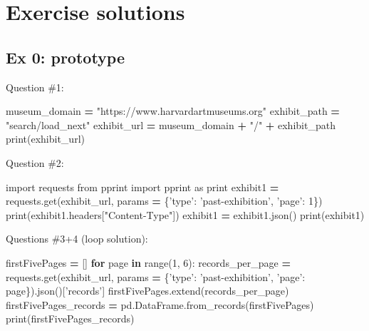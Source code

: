 \documentclass[
]{book}
\newenvironment{Shaded}{\begin{snugshade}}{\end{snugshade}}
\newcommand{\BuiltInTok}[1]{#1}
\newcommand{\ControlFlowTok}[1]{\textcolor[rgb]{0.13,0.29,0.53}{\textbf{#1}}}
\newcommand{\DecValTok}[1]{\textcolor[rgb]{0.00,0.00,0.81}{#1}}
\newcommand{\ImportTok}[1]{#1}
\newcommand{\KeywordTok}[1]{\textcolor[rgb]{0.13,0.29,0.53}{\textbf{#1}}}
\newcommand{\NormalTok}[1]{#1}
\newcommand{\OperatorTok}[1]{\textcolor[rgb]{0.81,0.36,0.00}{\textbf{#1}}}
\newcommand{\StringTok}[1]{\textcolor[rgb]{0.31,0.60,0.02}{#1}}
\begin{document}
\hypertarget{exercise-solutions-5}{%
\section{Exercise solutions}\label{exercise-solutions-5}}

\hypertarget{ex-0-prototype-5}{%
\subsection{Ex 0: prototype}\label{ex-0-prototype-5}}

Question \#1:

\begin{Shaded}
\begin{Highlighting}[]
\NormalTok{museum_domain }\OperatorTok{=} \StringTok{"https://www.harvardartmuseums.org"}
\NormalTok{exhibit_path }\OperatorTok{=} \StringTok{"search/load_next"}
\NormalTok{exhibit_url }\OperatorTok{=}\NormalTok{ museum_domain }\OperatorTok{+} \StringTok{"/"} \OperatorTok{+}\NormalTok{ exhibit_path}
\BuiltInTok{print}\NormalTok{(exhibit_url)}
\end{Highlighting}
\end{Shaded}

Question \#2:

\begin{Shaded}
\begin{Highlighting}[]
\ImportTok{import}\NormalTok{ requests}
\ImportTok{from}\NormalTok{ pprint }\ImportTok{import}\NormalTok{ pprint }\ImportTok{as} \BuiltInTok{print} 
\NormalTok{exhibit1 }\OperatorTok{=}\NormalTok{ requests.get(exhibit_url, params }\OperatorTok{=}\NormalTok{ \{}\StringTok{'type'}\NormalTok{: }\StringTok{'past-exhibition'}\NormalTok{, }\StringTok{'page'}\NormalTok{: }\DecValTok{1}\NormalTok{\})}
\BuiltInTok{print}\NormalTok{(exhibit1.headers[}\StringTok{"Content-Type"}\NormalTok{])}
\NormalTok{exhibit1 }\OperatorTok{=}\NormalTok{ exhibit1.json()}
\BuiltInTok{print}\NormalTok{(exhibit1)}
\end{Highlighting}
\end{Shaded}

Questions \#3+4 (loop solution):

\begin{Shaded}
\begin{Highlighting}[]
\NormalTok{firstFivePages }\OperatorTok{=}\NormalTok{ []}
\ControlFlowTok{for}\NormalTok{ page }\KeywordTok{in} \BuiltInTok{range}\NormalTok{(}\DecValTok{1}\NormalTok{, }\DecValTok{6}\NormalTok{):}
\NormalTok{    records_per_page }\OperatorTok{=}\NormalTok{ requests.get(exhibit_url, params }\OperatorTok{=}\NormalTok{ \{}\StringTok{'type'}\NormalTok{: }\StringTok{'past-exhibition'}\NormalTok{, }\StringTok{'page'}\NormalTok{: page\}).json()[}\StringTok{'records'}\NormalTok{]}
\NormalTok{    firstFivePages.extend(records_per_page)}
\NormalTok{firstFivePages_records }\OperatorTok{=}\NormalTok{ pd.DataFrame.from_records(firstFivePages)}
\BuiltInTok{print}\NormalTok{(firstFivePages_records)}
\end{Highlighting}
\end{Shaded}
\end{document}

